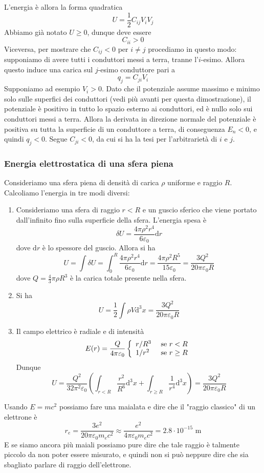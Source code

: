 \documentclass[a4paper,11pt]{book}
\newcommand{\dif}{\mathrm{d}}
\let\oldepsilon\epsilon
\let\oldvarepsilon\varepsilon
\renewcommand{\epsilon}{\oldvarepsilon}
\renewcommand{\varepsilon}{\oldepsilon}
\theoremstyle{definition}
\theoremstyle{theorem}
\begin{document}
	L'energia è allora la forma quadratica
	\[U=\frac{1}{2}C_{ij}V_iV_j\]
	Abbiamo già notato $U\geq0$, dunque deve essere
	\[C_{ii}>0\]
	Viceversa, per mostrare che $C_{ij}<0$ per $i\neq j$ procediamo in questo modo: supponiamo di avere tutti i conduttori messi a terra, tranne l'$i$-esimo. Allora questo induce una carica sul $j$-esimo conduttore pari a
	\[q_j=C_{ji}V_i\]
	Supponiamo ad esempio $V_i>0$. Dato che il potenziale assume massimo e minimo solo sulle superfici dei conduttori (vedi più avanti per questa dimostrazione), il potenziale è positivo in tutto lo spazio esterno ai conduttori, ed è nullo solo sui conduttori messi a terra. Allora la derivata in direzione normale del potenziale è positiva su tutta la superficie di un conduttore a terra, di conseguenza $E_n<0$, e quindi $q_j<0$. Segue $C_{ji}<0$, da cui si ha la tesi per l'arbitrarietà di $i$ e $j$. 
	\subsubsection{Energia elettrostatica di una sfera piena}
	Consideriamo una sfera piena di densità di carica $\rho$ uniforme e raggio $R$. Calcoliamo l'energia in tre modi diversi:
	\begin{enumerate}
		\item Consideriamo una sfera di raggio $r<R$ e un guscio sferico che viene portato dall'infinito fino sulla superficie della sfera. L'energia spesa è 
		\[\delta U=\frac{4\pi\rho^2r^4}{6\epsilon_0}\dif r\]
		dove $\dif r$ è lo spessore del guscio. Allora si ha
		\[U=\int\delta U=\int_{0}^{R}\frac{4\pi\rho^2r^4}{6\epsilon_0}\dif r=\frac{4\pi\rho^2 R^5}{15\epsilon_0}=\frac{3Q^2}{20\pi\epsilon_0 R}\]
		dove $Q=\frac{4}{3}\pi\rho R^3$ è la carica totale presente nella sfera.
		\item Si ha
		\[U=\frac{1}{2}\int\rho V\dif^3x=\frac{3Q^2}{20\pi\epsilon_0 R}\]
		\item Il campo elettrico è radiale e di intensità
		\[E(r)=\frac{Q}{4\pi\epsilon_0}\left\{\begin{array}{l l}
		r/R^3&\textrm{ se }r<R\\1/r^2&\textrm{ se }r\geq R
		\end{array}\right.\]
		Dunque
		\[U=\frac{Q^2}{32\pi^2\epsilon_0}\left(\int_{r<R}\frac{r^2}{R^6}\dif^3x+\int_{r\geq R}\frac{1}{r^4}\dif^3x\right)=\frac{3Q^2}{20\pi\epsilon_0 R}\]
	\end{enumerate}
	Usando $E=mc^2$ possiamo fare una maialata e dire che il "raggio classico" di un elettrone è
	\[r_e=\frac{3e^2}{20\pi\epsilon_0m_ec^2}\approx\frac{e^2}{4\pi\epsilon_0m_ec^2}=2.8\cdot10^{-15}\textrm{ m}\]
	E se siamo ancora più maiali possiamo pure dire che tale raggio è talmente piccolo da non poter essere misurato, e quindi non si può neppure dire che sia sbagliato parlare di raggio dell'elettrone.
\end{document}
